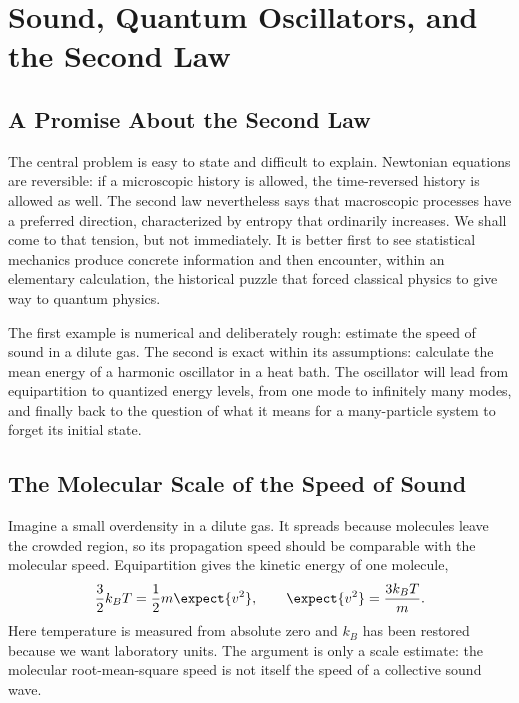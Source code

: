 \chapter{Sound, Quantum Oscillators, and the Second Law}


\section{A Promise About the Second Law}

The central problem is easy to state and difficult to explain.  Newtonian
equations are reversible: if a microscopic history is allowed, the
time-reversed history is allowed as well.  The second law nevertheless says
that macroscopic processes have a preferred direction, characterized by
entropy that ordinarily increases.  We shall come to that tension, but not
immediately.  It is better first to see statistical mechanics produce
concrete information and then encounter, within an elementary calculation,
the historical puzzle that forced classical physics to give way to quantum
physics.

The first example is numerical and deliberately rough: estimate the speed of
sound in a dilute gas.  The second is exact within its assumptions: calculate
the mean energy of a harmonic oscillator in a heat bath.  The oscillator will
lead from equipartition to quantized energy levels, from one mode to infinitely
many modes, and finally back to the question of what it means for a
many-particle system to forget its initial state.

\section{The Molecular Scale of the Speed of Sound}

Imagine a small overdensity in a dilute gas.  It spreads because molecules
leave the crowded region, so its propagation speed should be comparable with
the molecular speed.  Equipartition gives the kinetic energy of one molecule,
\begin{equation}
 \frac{3}{2}k_B T
 =\frac{1}{2}m\expect{v^2},
 \qquad
 \expect{v^2}=\frac{3k_B T}{m}.
 \label{eq:sm7-molecular-speed}
\end{equation}
Here temperature is measured from absolute zero and \(k_B\) has been restored
because we want laboratory units.  The argument is only a scale estimate:
the molecular root-mean-square speed is not itself the speed of a collective
sound wave.


